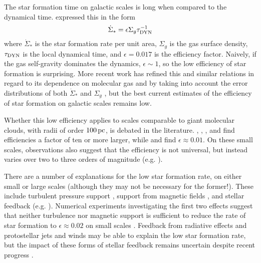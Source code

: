 \documentclass[../dissertation.tex]{subfiles}
\begin{document}
The star formation time on galactic scales is long when compared to the dynamical time. 
\citet{1998ApJ...498..541K} expressed this in the form
\begin{equation}
\dot{\Sigma}_* = \epsilon\Sigma_g \tau_{\rm DYN}^{-1}
\end{equation}
where $\dot{\Sigma}_*$ is the star formation rate per unit area, $\Sigma_g$ is the 
gas surface density, $\tau_{\rm DYN}$ is the local dynamical time, and $\epsilon = 0.017$ 
is the efficiency factor.  Naively, if the gas self-gravity dominates the dynamics, $\epsilon \sim 1$, so 
the low efficiency of star formation is surprising.  More recent work has refined this and similar relations in regard to its dependence on molecular gas \citep{2008AJ....136.2846B} and by taking into account the error distributions of both $\dot\Sigma_*$ and $\Sigma_g$ \citep{2013MNRAS.430..288S}, but the best current estimates of the efficiency of star formation on galactic scales remains low. 

Whether this low efficiency applies to scales comparable to giant molecular clouds, with radii of
order $100\,\rm pc$, is debated in the literature.
\citet{2010ApJ...723.1019H}, \citet{2010ApJ...724..687L}, \citet{2010ApJS..188..313W}, and \citet{2011ApJ...729..133M} 
find efficiencies a factor of ten or more larger, while \citet{2007ApJ...654..304K} and \citet{2012ApJ...745...69K} 
find $\epsilon\approx0.01$.
On these small scales, observations also suggest that the efficiency is not universal, but instead 
varies over two to three orders of magnitude (e.g.  
\citealt{1988ApJ...334L..51M,2016arXiv160805415L}).%

There are a number of explanations for the low star formation rate, on 
either small or large scales (although they may not be necessary for the former!). These include 
turbulent pressure support \citep{1992ApJ...396..631M}, support from magnetic fields
\citep{1966MNRAS.132..359S,1976ApJ...207..141M}, and stellar feedback (e.g.
\citealt{1986ApJ...303...39D}).  Numerical experiments investigating the first two 
effects suggest that neither turbulence nor magnetic support is sufficient 
to reduce the rate of star formation to $\epsilon\approx 0.02$ on small scales
\citep{2010ApJ...709...27W,2011MNRAS.410L...8C,2011ApJ...730...40P,2012ApJ...754...71K,2014MNRAS.439.3420M}.  Feedback from radiative effects and protostellar jets and winds may be able to explain the low star formation rate, but the impact of these forms of stellar feedback remains uncertain despite recent progress
\citep{2010ApJ...709...27W,2014MNRAS.439.3420M,2015MNRAS.450.4035F}.
\end{document}
